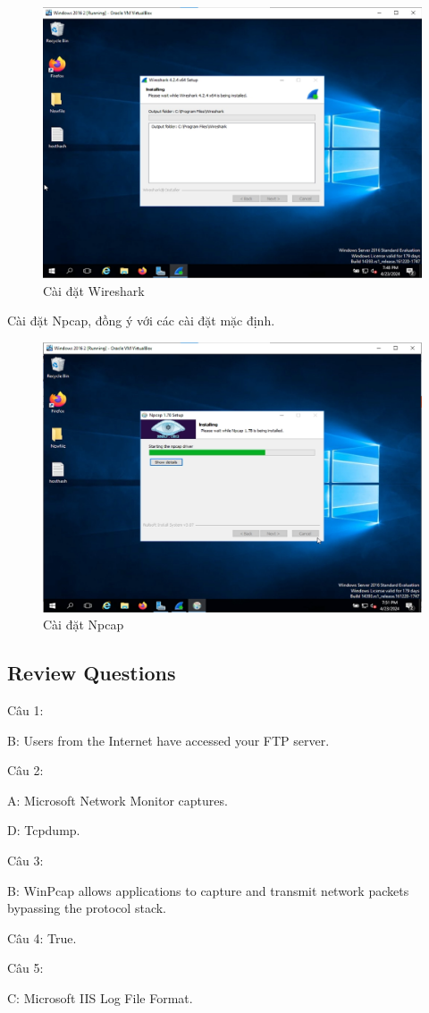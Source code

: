 \begin{figure}[!htb]
    \centering
    \includegraphics[width=0.9\linewidth]{figure//chapter9//lab9_2/install_wireshark.png}
    \caption{Cài đặt Wireshark}
    \label{fig:enter-label}
\end{figure}

 Cài đặt Npcap, đồng ý với các cài đặt mặc định.


\begin{figure}[!htb]
    \centering
    \includegraphics[width=0.9\linewidth]{figure//chapter9//lab9_2/install_npcap.png}
    \caption{Cài đặt Npcap}
    \label{fig:enter-label}
\end{figure}

\subsection{Review Questions}

\noindent Câu 1:

B: Users from the Internet have accessed your FTP server.

\noindent Câu 2: 

A: Microsoft Network Monitor captures.

D: Tcpdump.

\noindent Câu 3: 

B: WinPcap allows applications to capture and transmit network packets bypassing the protocol stack.

\noindent Câu 4: True.

\noindent Câu 5:

C: Microsoft IIS Log File Format.